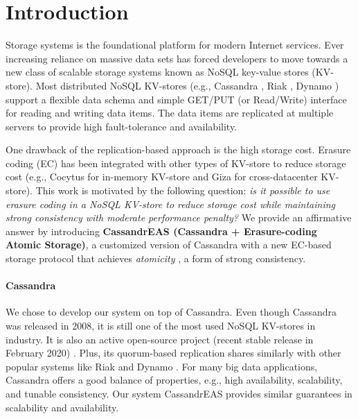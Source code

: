 \section{Introduction}
\label{sec:intro}



Storage systems is the foundational platform for modern Internet services. Ever increasing reliance on massive data sets has forced developers to move towards a new class of scalable storage systems known as NoSQL key-value stores (KV-store). Most distributed NoSQL KV-stores (e.g., Cassandra \cite{Cassandra}, Riak \cite{Riak}, Dynamo \cite{Dynamo}) support a flexible data schema and simple GET/PUT (or Read/Write) interface for reading and writing data items. 
The data items are replicated at multiple servers to provide high fault-tolerance and availability. 

One drawback of the replication-based approach is the high storage cost. Erasure coding (EC) has been integrated with other types of KV-store to reduce storage cost (e.g., Cocytus \cite{Cocytus2016} for in-memory KV-store  and Giza \cite{GIZA2017} for cross-datacenter KV-store).
This work is motivated by the following question: \textit{is it possible to use erasure coding in a NoSQL KV-store to reduce storage cost while maintaining strong consistency with moderate performance penalty?} We provide an affirmative answer by introducing \textbf{CassandrEAS (Cassandra + Erasure-coding Atomic Storage)}, a customized version of Cassandra \cite{Cassandra} with a new EC-based storage protocol that achieves \textit{atomicity} \cite{lamport}, a form of strong consistency.

\paragraph*{Cassandra}

We chose to develop our system on top of Cassandra. Even though Cassandra was released in 2008, it is still one of the most used NoSQL KV-stores in industry. It is also an active open-source project (recent stable release in February 2020) \cite{DBEnginesCassandra}. Plus, its quorum-based replication \cite{pbs-vldb2012} shares similarly with other popular systems like Riak \cite{Riak} and Dynamo \cite{Dynamo}. For many big data applications, Cassandra offers a good balance of properties, e.g., high availability, scalability, and tunable consistency. Our system CassandrEAS provides similar guarantees in scalability and availability.%


